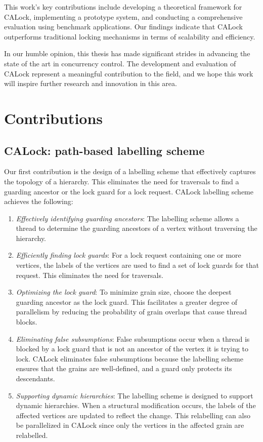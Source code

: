 This work's key contributions include developing a theoretical framework for CALock, implementing a prototype system, and conducting a comprehensive evaluation using benchmark applications. Our findings indicate that CALock outperforms traditional locking mechanisms in terms of scalability and efficiency.


In our humble opinion, this thesis has made significant strides in advancing the state of the art in concurrency control. The development and evaluation of CALock represent a meaningful contribution to the field, and we hope this work will inspire further research and innovation in this area.
\section{Contributions}

\subsection{CALock: path-based labelling scheme}
Our first contribution is the design of a labelling scheme that effectively captures the topology of a hierarchy. This eliminates the need for traversals to find a guarding ancestor or the lock guard for a lock request. CALock labelling scheme achieves the following: 

\begin{enumerate}
    \item \emph{Effectively identifying guarding ancestors}: The labelling scheme allows a thread to determine the guarding ancestors of a vertex without traversing the hierarchy.
    \item \emph{Efficiently finding lock guards}: For a lock request containing one or more vertices, the labels of the vertices are used to find a set of lock guards for that request. This eliminates the need for traversals. 
    \item \emph{Optimizing the lock guard}: To minimize grain size, choose the deepest guarding ancestor as the lock guard. This facilitates a greater degree of parallelism by reducing the probability of grain overlaps that cause thread blocks.
    \item \emph{Eliminating false subsumptions}: False subsumptions occur when a thread is blocked by a lock guard that is not an ancestor of the vertex it is trying to lock. CALock eliminates false subsumptions because the labelling scheme ensures that the grains are well-defined, and a guard only protects its descendants.
    \item \emph{Supporting dynamic hierarchies}: The labelling scheme is designed to support dynamic hierarchies. When a structural modification occurs, the labels of the affected vertices are updated to reflect the change. This relabelling can also be parallelized in CALock since only the vertices in the affected grain are relabelled. 
\end{enumerate}


